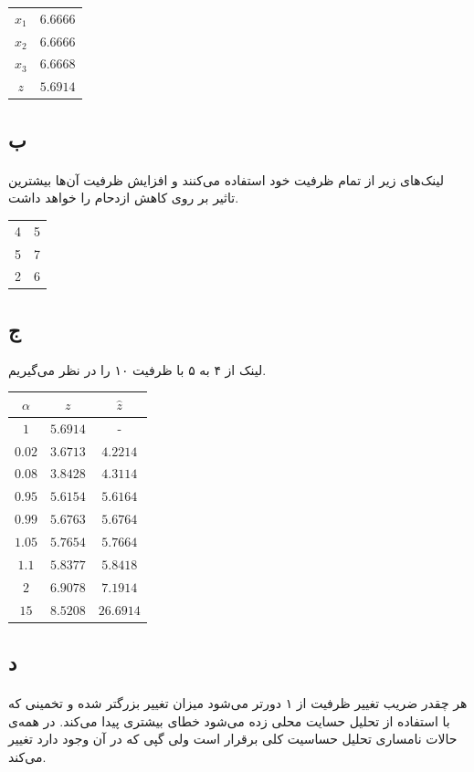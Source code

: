 \documentclass[paper=a4, fontsize=11pt]{article}
\numberwithin{equation}{section} %
\numberwithin{figure}{section} %
\numberwithin{table}{section} %
\begin{document}
\begin{tabular}{cl}
	\(x_1\) & \(6.6666\) \\
	\(x_2\) & \(6.6666\) \\
	\(x_3\) & \(6.6668\) \\
	\(z\) & \(5.6914\) \\
\end{tabular}

\subsection{ب}
\paragraph{}
لینک‌های زیر از تمام ظرفیت خود استفاده می‌کنند و افزایش ظرفیت آن‌ها
بیشترین تاثیر بر روی کاهش ازدحام را خواهد داشت.

\begin{tabular}{c c}
	4 & 5\\
	5 & 7\\
	2 & 6\\
\end{tabular}

\subsection{ج}
\paragraph{}
لینک از ۴ به ۵ با ظرفیت ۱۰ را در نظر می‌گیریم.

\begin{tabular}{c | c | c}
	\(\alpha\) & \(z\) & \(\hat{z}\)\\
	\hline
	\(1\) & \(5.6914\) & -\\
	\(0.02\) & \(3.6713\) & \(4.2214\)\\
	\(0.08\) & \(3.8428\) & \(4.3114\)\\
	\(0.95\) & \(5.6154\) & \(5.6164\)\\
	\(0.99\) & \(5.6763\) & \(5.6764\)\\
	\(1.05\) & \(5.7654\) & \(5.7664\)\\
	\(1.1\) & \(5.8377\) & \(5.8418\)\\
	\(2\) & \(6.9078\) & \(7.1914\)\\
	\(15\) & \(8.5208\) & \(26.6914\)\\
\end{tabular}

\subsection{د}
\paragraph{}
هر چقدر ضریب تغییر ظرفیت از ۱ دورتر می‌شود میزان تغییر بزرگتر شده و تخمینی
که با استفاده از تحلیل حسایت محلی زده می‌شود خطای بیشتری پیدا می‌کند.
در همه‌ی حالات نامساری تحلیل حساسیت کلی برقرار است ولی
گپی که در آن وجود دارد تغییر می‌کند.
\end{document}
